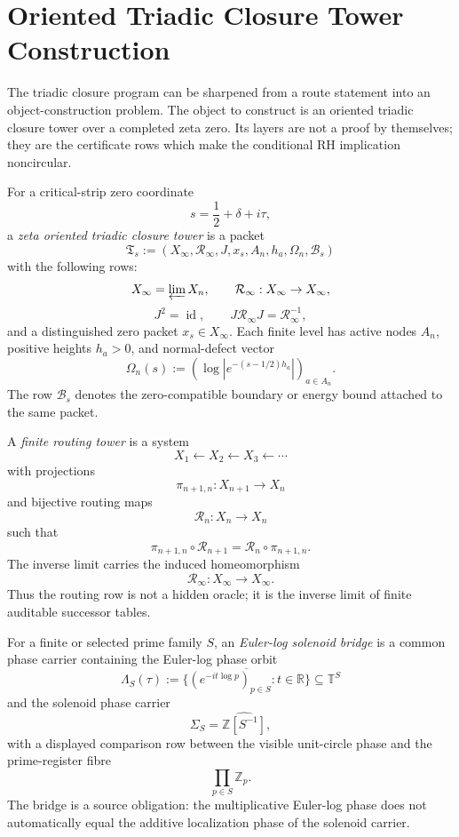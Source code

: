 \section{Oriented Triadic Closure Tower Construction}
\label{sec:unified-reality-oriented-triadic-closure-tower-construction}

The triadic closure program can be sharpened from a route statement into
an object-construction problem.  The object to construct is an oriented
triadic closure tower over a completed zeta zero.  Its layers are not a
proof by themselves; they are the certificate rows which make the
conditional RH implication noncircular.

\begin{definition}
\label{def:unified-reality-zeta-oriented-triadic-closure-tower}
For a critical-strip zero coordinate
$$
s=\frac12+\delta+i\tau,
$$
a \emph{zeta oriented triadic closure tower} is a packet
$$
\mathfrak T_s
:=
(X_\infty,\mathcal R_\infty,J,x_s,A_n,h_a,\Omega_n,\mathcal B_s)
$$
with the following rows:
$$
X_\infty=\varprojlim X_n,
\qquad
\mathcal R_\infty:X_\infty\to X_\infty,
$$
$$
J^2=\operatorname{id},
\qquad
J\mathcal R_\infty J=\mathcal R_\infty^{-1},
$$
and a distinguished zero packet $x_s\in X_\infty$.  Each finite level
has active nodes $A_n$, positive heights $h_a>0$, and normal-defect
vector
$$
\Omega_n(s):=(\log|e^{-(s-1/2)h_a}|)_{a\in A_n}.
$$
The row $\mathcal B_s$ denotes the zero-compatible boundary or energy
bound attached to the same packet.
\end{definition}

\begin{definition}
\label{def:unified-reality-finite-routing-tower}
A \emph{finite routing tower} is a system
$$
X_1\leftarrow X_2\leftarrow X_3\leftarrow\cdots
$$
with projections
$$
\pi_{n+1,n}:X_{n+1}\to X_n
$$
and bijective routing maps
$$
\mathcal R_n:X_n\to X_n
$$
such that
$$
\pi_{n+1,n}\circ\mathcal R_{n+1}
=
\mathcal R_n\circ\pi_{n+1,n}.
$$
The inverse limit carries the induced homeomorphism
$$
\mathcal R_\infty:X_\infty\to X_\infty.
$$
Thus the routing row is not a hidden oracle; it is the inverse limit of
finite auditable successor tables.
\end{definition}

\begin{definition}
\label{def:unified-reality-euler-log-solenoid-bridge}
For a finite or selected prime family $S$, an \emph{Euler-log solenoid
bridge} is a common phase carrier containing the Euler-log phase orbit
$$
\Lambda_S(\tau)
:=
\overline{\{(e^{-it\log p})_{p\in S}:t\in\mathbb R\}}
\subseteq\mathbb T^S
$$
and the solenoid phase carrier
$$
\Sigma_S=\widehat{\mathbb Z[S^{-1}]},
$$
with a displayed comparison row between the visible unit-circle phase
and the prime-register fibre
$$
\prod_{p\in S}\mathbb Z_p.
$$
The bridge is a source obligation: the multiplicative Euler-log phase
does not automatically equal the additive localization phase of the
solenoid carrier.
\end{definition}

